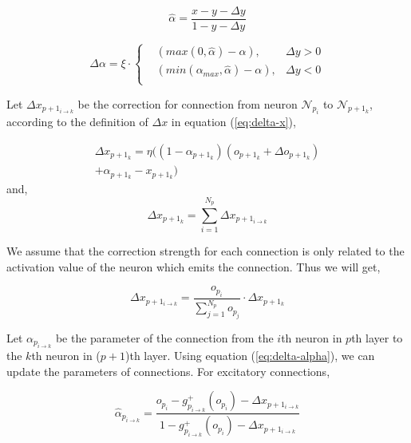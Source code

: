 \documentclass[conference]{IEEEtran}
\begin{document}
\begin{equation}
    \hat{\alpha}=\frac{x-y-\Delta{y}}{1-y-\Delta{y}}
    \label{eq:expected-alpha}
\end{equation}

\begin{equation}
\Delta{\alpha} =\xi\cdot\left\{
    \begin{aligned}
        &\left(max\left(0,\hat{\alpha}\right)-\alpha\right),&\Delta{y}>0\\
        &\left(min\left(\alpha_{max}, \hat{\alpha}\right)-\alpha\right),&\Delta{y}<0\\
    \end{aligned}
    \right.
\label{eq:delta-alpha}
\end{equation}

Let $\Delta x_{p+1_{i\rightarrow{k}}}$ be the correction for connection
from neuron $\mathcal{N}_{p_i}$ to $\mathcal{N}_{p+1_k}$,
according to the definition of $\Delta x$ in equation (\ref{eq:delta-x}),

\begin{multline}
    \Delta x_{p+1_k} = \eta((1-\alpha_{p+1_k})(o_{p+1_k}+\Delta o_{p+1_k})\\
        +\alpha_{p+1_k}-x_{p+1_k})
    \label{eq:delta-x-real}
\end{multline}
and,
\begin{equation}
    \Delta x_{p+1_k} = \sum_{i=1}^{N_p}\Delta x_{p+1_{i\rightarrow{k}}}
    \label{eq:delta-sum}
\end{equation}

We assume that the correction strength for each connection is only related
to the activation value of the neuron which emits the connection. Thus we
will get,

\begin{equation}
    \Delta x_{p+1_{i\rightarrow{k}}} = \frac{o_{p_i}}{\sum_{j=1}^{N_p}o_{p_j}}\cdot\Delta x_{p+1_k}
    \label{eq:conn-error}
\end{equation}

Let $\alpha_{p_{i\rightarrow{k}}}$ be the parameter of the connection from the
$i$th neuron in $p$th layer to the $k$th neuron in ($p+1$)th layer.
Using equation (\ref{eq:delta-alpha}), we can update the parameters of connections.
For excitatory connections,

\begin{equation}
    \hat{\alpha}_{p_{i\rightarrow{k}}}=
        \frac{ o_{p_i}-g^{+}_{p_{i\rightarrow{k}}}(o_{p_i})-\Delta x_{p+1_{i\rightarrow{k}}} }{
        1-g^{+}_{p_{i\rightarrow{k}}}(o_{p_i})-\Delta x_{p+1_{i\rightarrow{k}}} }
    \label{eq:alpha-plus-pos}
\end{equation}
\end{document}
